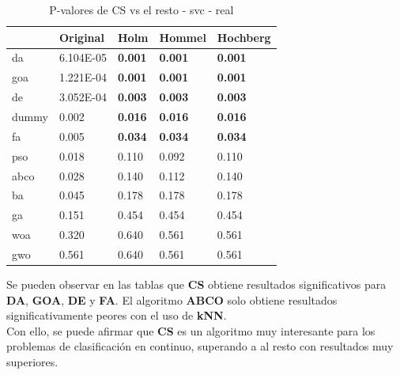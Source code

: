 \begin{table}
    \centering
    \begin{tabular}{lllll}
        \toprule
        {}    & Original  & Holm           & Hommel         & Hochberg       \\
        \midrule
        da    & 6.104E-05 & \textbf{0.001} & \textbf{0.001} & \textbf{0.001} \\
        goa   & 1.221E-04 & \textbf{0.001} & \textbf{0.001} & \textbf{0.001} \\
        de    & 3.052E-04 & \textbf{0.003} & \textbf{0.003} & \textbf{0.003} \\
        dummy & 0.002     & \textbf{0.016} & \textbf{0.016} & \textbf{0.016} \\
        fa    & 0.005     & \textbf{0.034} & \textbf{0.034} & \textbf{0.034} \\
        pso   & 0.018     & 0.110          & 0.092          & 0.110          \\
        abco  & 0.028     & 0.140          & 0.112          & 0.140          \\
        ba    & 0.045     & 0.178          & 0.178          & 0.178          \\
        ga    & 0.151     & 0.454          & 0.454          & 0.454          \\
        woa   & 0.320     & 0.640          & 0.561          & 0.561          \\
        gwo   & 0.561     & 0.640          & 0.561          & 0.561          \\
        \bottomrule
    \end{tabular}
    \caption{P-valores de CS vs el resto - svc - real}
    \label{tab:p-values_cs_rest_real_svc}
\end{table}

Se pueden observar en las tablas que \textbf{CS} obtiene resultados significativos para \textbf{DA}, \textbf{GOA}, \textbf{DE} y \textbf{FA}. El algoritmo \textbf{ABCO} solo obtiene resultados significativamente peores con el uso de \textbf{kNN}.\\[6pt]
Con ello, se puede afirmar que \textbf{CS} es un algoritmo muy interesante para los problemas de clasificación en continuo, superando a al resto con resultados muy superiores.

